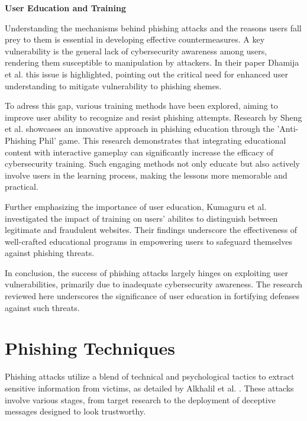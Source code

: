 \documentclass[
  a4paper,  %
  twoside,  %
  bibliography=totoc,
  headsepline,
  cleardoublepage=empty,
  parskip=half,
  draft=false
]{scrbook}
\begin{document}
\textbf{User Education and Training}

Understanding the mechanisms behind phishing attacks and the reasons users fall prey to them is essential in developing effective countermeasures. A key vulnerability is the general lack of cybersecurity awareness among users, rendering them susceptible to manipulation by attackers. In their paper Dhamija et al. \cite{dhamija} this issue is highlighted, pointing out the critical need for enhanced user understanding to mitigate vulnerability to phishing shemes. 

To adress this gap, various training methods have been explored, aiming to improve user ability to recognize and resist phishing attempts. Research by Sheng et al. \cite{sheng} showcases an innovative approach in phishing education through the 'Anti-Phishing Phil' game. This research demonstrates that integrating educational content with interactive gameplay can significantly increase the efficacy of cybersecurity training. Such engaging methods not only educate but also actively involve users in the learning process, making the lessons more memorable and practical. 

Further emphasizing the importance of user education, Kumaguru et al. \cite{kumaraguru} investigated the impact of training on users' abilites to distinguish between legitimate and fraudulent websites. Their findings underscore the effectiveness of well-crafted educational programs in empowering users to safeguard themselves against phishing threats. 

In conclusion, the success of phishing attacks largely hinges on exploiting user vulnerabilities, primarily due to inadequate cybersecurity awareness. The research reviewed here underscores the significance of user education in fortifying defenses against such threats.

\section{Phishing Techniques}
Phishing attacks utilize a blend of technical and psychological tactics to extract sensitive information from victims, as detailed by Alkhalil et al. \cite{alkhalil}. These attacks involve various stages, from target research to the deployment of deceptive messages designed to look trustworthy.
\end{document}
